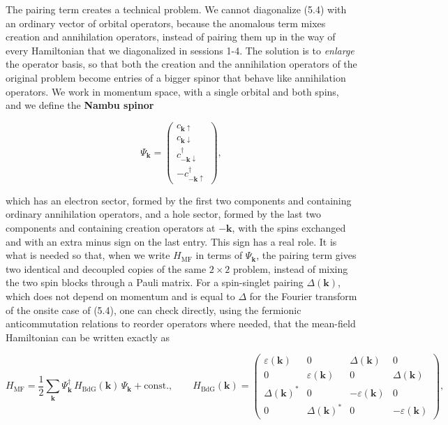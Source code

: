 The pairing term creates a technical problem. We cannot diagonalize (5.4) with an ordinary vector of
orbital operators, because the anomalous term mixes creation and annihilation operators, instead of
pairing them up in the way of every Hamiltonian that we diagonalized in sessions 1-4. The solution
is to \emph{enlarge} the operator basis, so that both the creation and the annihilation operators of
the original problem become entries of a bigger spinor that behave like annihilation operators. We
work in momentum space, with a single orbital and both spins, and we define the \textbf{Nambu
spinor}

\begin{equation}
\Psi_{\mathbf{k}} = \begin{pmatrix} c_{\mathbf{k}\uparrow} \\ c_{\mathbf{k}\downarrow} \\ c_{-\mathbf{k}\downarrow}^\dagger \\ -c_{-\mathbf{k}\uparrow}^\dagger \end{pmatrix},
\end{equation}

which has an electron sector, formed by the first two components and containing
ordinary annihilation operators, and a hole sector, formed by the last two components and
containing creation operators at $-\mathbf{k}$, with the spins exchanged and with an extra minus sign
on the last entry. This sign has a real role. It is what is needed so that, when we write
$H_{\text{MF}}$ in terms of $\Psi_{\mathbf k}$, the pairing term gives two identical and decoupled
copies of the same $2\times 2$ problem, instead of mixing the two spin blocks through a Pauli
matrix. For a spin-singlet pairing $\Delta(\mathbf k)$, which does not depend on momentum and is
equal to $\Delta$ for the Fourier transform of the onsite case of (5.4), one can check directly,
using the fermionic anticommutation relations to reorder operators where needed, that the
mean-field Hamiltonian can be written exactly as

\begin{equation}
H_{\text{MF}} = \frac{1}{2}\sum_{\mathbf{k}} \Psi_{\mathbf{k}}^\dagger\, H_{\text{BdG}}(\mathbf{k})\, \Psi_{\mathbf{k}} + \text{const.}, \qquad H_{\text{BdG}}(\mathbf{k}) = \begin{pmatrix} \varepsilon(\mathbf{k}) & 0 & \Delta(\mathbf k) & 0 \\ 0 & \varepsilon(\mathbf k) & 0 & \Delta(\mathbf k) \\ \Delta(\mathbf k)^* & 0 & -\varepsilon(\mathbf{k}) & 0 \\ 0 & \Delta(\mathbf k)^* & 0 & -\varepsilon(\mathbf k) \end{pmatrix},
\end{equation}

